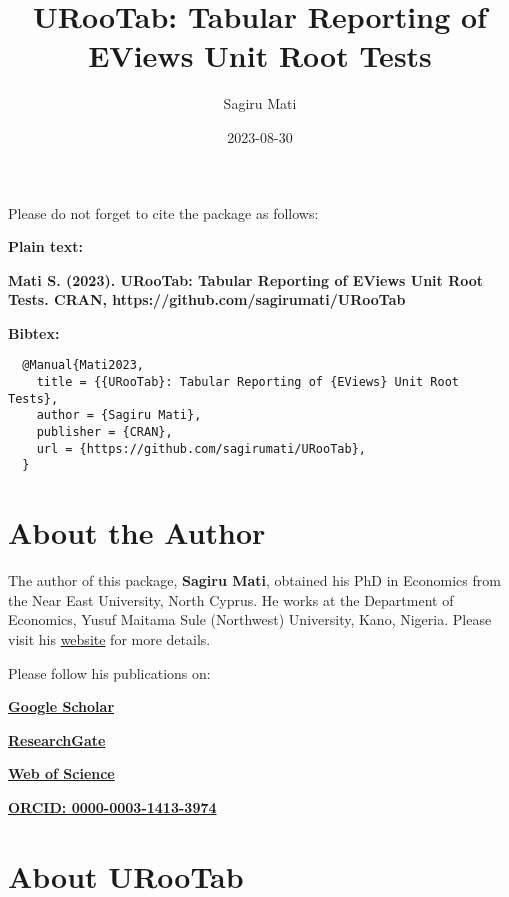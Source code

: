 \documentclass[
  letterpaper,
  DIV=11,
  numbers=noendperiod]{scrartcl}
\title{URooTab: Tabular Reporting of EViews Unit Root Tests}
\author{Sagiru Mati}
\date{2023-08-30}
\begin{document}
\maketitle
\ifdefined\Shaded\renewenvironment{Shaded}{\begin{tcolorbox}[boxrule=0pt, breakable, interior hidden, sharp corners, enhanced, frame hidden, borderline west={3pt}{0pt}{shadecolor}]}{\end{tcolorbox}}\fi

Please do not forget to cite the package as follows:

\textbf{Plain text:}

\textbf{Mati S. (2023). URooTab: Tabular Reporting of EViews Unit Root
Tests. CRAN, https://github.com/sagirumati/URooTab}

\textbf{Bibtex:}

\begin{verbatim}
  @Manual{Mati2023,
    title = {{URooTab}: Tabular Reporting of {EViews} Unit Root Tests},
    author = {Sagiru Mati},
    publisher = {CRAN},
    url = {https://github.com/sagirumati/URooTab},
  }
\end{verbatim}

\hypertarget{about-the-author}{%
\section{About the Author}\label{about-the-author}}

The author of this package, \textbf{Sagiru Mati}, obtained his PhD in
Economics from the Near East University, North Cyprus. He works at the
Department of Economics, Yusuf Maitama Sule (Northwest) University,
Kano, Nigeria. Please visit his \href{https://smati.com.ng}{website} for
more details.

Please follow his publications on:

\href{https://scholar.google.com/citations?user=odEp1eIAAAAJ\&hl=en\&oi=ao}{\textbf{Google
Scholar}}

\href{https://www.researchgate.net/profile/Sagiru-Mati-2}{\textbf{ResearchGate}}

\href{https://www.webofscience.com/wos/author/record/P-3408-2017}{\textbf{Web
of Science}}

\href{https://orcid.org/0000-0003-1413-3974}{\textbf{ORCID:
0000-0003-1413-3974}}

\hypertarget{about-urootab}{%
\section{About URooTab}\label{about-urootab}}
\end{document}
